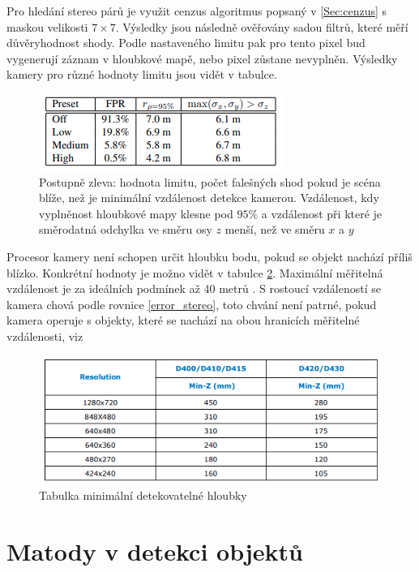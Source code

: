 \documentclass[twoside]{ctuthesis}
\begin{document}
    Pro hledání stereo párů je využit cenzus algoritmus popsaný v \ref{Sec:cenzus} s maskou velikosti $7 \times 7 $. Výsledky jsou následně ověřovány sadou filtrů, které měří důvěryhodnost shody. Podle nastaveného limitu pak pro tento pixel bud vygenerují záznam v hloubkové mapě, nebo pixel zůstane nevyplněn. Výsledky kamery pro různé hodnoty limitu jsou vidět v tabulce. 
\begin{figure}
    \centering
    \includegraphics[width = 0.8\linewidth]{pictures/realsense_threshold.png}
    \caption{Postupně zleva: hodnota limitu, počet falešných shod pokud je scéna blíže, než je minimální vzdálenost detekce kamerou. Vzdálenost, kdy vyplněnost hloubkové mapy klesne pod $95\%$ a vzdálenost při které je směrodatná odchylka ve směru osy $z$ menší, než ve směru $x$ a $y$ \cite{keselman2017intel}}
    \label{fig:tablka_limity}
\end{figure}

Procesor kamery není schopen určit hloubku bodu, pokud se objekt nachází příliš blízko. Konkrétní hodnoty je možno vidět v tabulce \ref{Fig:minimalni_hloubka}. Maximální měřitelná vzdálenost je za ideálních podmínek až 40 metrů \cite{keselman2017intel}. S rostoucí vzdáleností se kamera chová podle rovnice \ref{error_stereo}, toto chvání není patrné, pokud kamera operuje s objekty, které se nachází na obou hranicích měřitelné vzdálenosti, viz

\begin{figure}
    \centering
    \includegraphics[width = 0.8\linewidth]{pictures/minimalni_vzdalenost.png}
    \caption{Tabulka minimální detekovatelné hloubky \cite{RealSense_datasheet}}
    \label{Fig:minimalni_hloubka}
\end{figure}

\section{Matody v detekci objektů}
\end{document}
